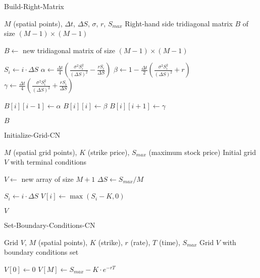 \documentclass[12pt,a4paper]{article}
\numberwithin{algorithm}{subsection}
\begin{document}
\begin{algorithm}[H]
\caption{Build-Right-Matrix}
\begin{algorithmic}[1]
\REQUIRE $M$ (spatial points), $\Delta t$, $\Delta S$, $\sigma$, $r$, $S_{max}$
\ENSURE Right-hand side tridiagonal matrix $B$ of size $(M-1) \times (M-1)$

\STATE $B \leftarrow$ new tridiagonal matrix of size $(M-1) \times (M-1)$

    \STATE $S_i \leftarrow i \cdot \Delta S$
    \STATE $\alpha \leftarrow \frac{\Delta t}{4} \left( \frac{\sigma^2 S_i^2}{(\Delta S)^2} - \frac{rS_i}{\Delta S} \right)$
    \STATE $\beta \leftarrow 1 - \frac{\Delta t}{2} \left( \frac{\sigma^2 S_i^2}{(\Delta S)^2} + r \right)$
    \STATE $\gamma \leftarrow \frac{\Delta t}{4} \left( \frac{\sigma^2 S_i^2}{(\Delta S)^2} + \frac{rS_i}{\Delta S} \right)$
    
        \STATE $B[i][i-1] \leftarrow \alpha$ 
    \ENDIF
    \STATE $B[i][i] \leftarrow \beta$ 
        \STATE $B[i][i+1] \leftarrow \gamma$ 
    \ENDIF
\ENDFOR

\RETURN $B$
\end{algorithmic}
\end{algorithm}

\begin{algorithm}[H]
\caption{Initialize-Grid-CN}
\begin{algorithmic}[1]
\REQUIRE $M$ (spatial grid points), $K$ (strike price), $S_{max}$ (maximum stock price)
\ENSURE Initial grid $V$ with terminal conditions

\STATE $V \leftarrow$ new array of size $M+1$
\STATE $\Delta S \leftarrow S_{max} / M$

    \STATE $S_i \leftarrow i \cdot \Delta S$
    \STATE $V[i] \leftarrow \max(S_i - K, 0)$ 
\ENDFOR

\RETURN $V$
\end{algorithmic}
\end{algorithm}

\begin{algorithm}[H]
\caption{Set-Boundary-Conditions-CN}
\begin{algorithmic}[1]
\REQUIRE Grid $V$, $M$ (spatial points), $K$ (strike), $r$ (rate), $T$ (time), $S_{max}$
\ENSURE Grid $V$ with boundary conditions set

\STATE $V[0] \leftarrow 0$ 
\STATE $V[M] \leftarrow S_{max} - K \cdot e^{-rT}$ 
\end{algorithmic}
\end{algorithm}
\end{document}
